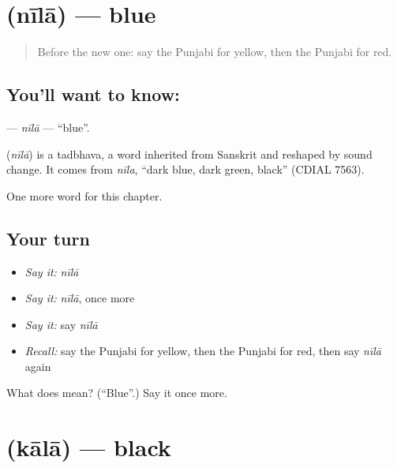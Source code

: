 \section[\texorpdfstring{\pa{ਨੀਲਾ} (nīlā)}{ਨੀਲਾ (nīlā)}]{ (nīlā) — blue}

\label{lesson:PA-C84-nila}



\begin{quote}
Before the new one: say the Punjabi for yellow, then the Punjabi for red.
\end{quote}

\subsection*{You'll want to know: }
\textbf{} — \emph{nīlā} — \textquotedblleft{}blue\textquotedblright{}.

\begin{cousinweb}
\textbf{} (\emph{nīlā}) is a tadbhava, a word inherited from Sanskrit and reshaped by sound change. It comes from \emph{nīla}, \textquotedblleft{}dark blue, dark green, black\textquotedblright{} (CDIAL 7563).
\end{cousinweb}

\begin{grammarlens}[title={What you've built}]
One more word for this chapter.
\end{grammarlens}

\subsection*{Your turn}
\begin{itemize}
\raggedright
  \item \emph{Say it:} \emph{nīlā}
  \item \emph{Say it:} \emph{nīlā}, once more
  \item \emph{Say it:} say \emph{nīlā}
  \item \emph{Recall:} say the Punjabi for yellow, then the Punjabi for red, then say \emph{nīlā} again
\end{itemize}

\begin{tcolorbox}[breakable,colback=teal!4,colframe=teal!35!black,title={Before you move on}]
What does  mean? (\textquotedblleft{}Blue\textquotedblright{}.) Say it once more.
\end{tcolorbox}
\section[\texorpdfstring{\pa{ਕਾਲਾ} (kālā)}{ਕਾਲਾ (kālā)}]{ (kālā) — black}


